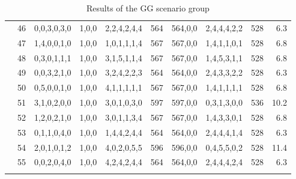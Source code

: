 \documentclass[review,12pt, 3p, times]{elsarticle}
\begin{document}
\begin{longtable}{|c|c|c|c|c|c|c|c|c|r|}
    & 46 & 0,0,3,0,3,0 & 1,0,0 &2,2,4,2,4,4 & 564 & 564,0,0 & 2,4,4,4,2,2 & 528 & 6.3  \\
    & 47 & 1,4,0,0,1,0 & 1,0,0 &1,0,1,1,1,4 & 567 & 567,0,0 & 1,4,1,1,0,1 & 528 & 6.8  \\
    & 48 & 0,3,0,1,1,1 & 1,0,0 &3,1,5,1,1,4 & 567 & 567,0,0 & 1,4,5,3,1,1 & 528 & 6.8  \\
    & 49 & 0,0,3,2,1,0 & 1,0,0 &3,2,4,2,2,3 & 564 & 564,0,0 & 2,4,3,3,2,2 & 528 & 6.3  \\
    & 50 & 0,5,0,0,1,0 & 1,0,0 &4,1,1,1,1,1 & 567 & 567,0,0 & 1,4,1,1,1,1 & 528 & 6.8  \\
    & 51 & 3,1,0,2,0,0 & 1,0,0 &3,0,1,0,3,0 & 597 & 597,0,0 & 0,3,1,3,0,0 & 536 & 10.2 \\
    & 52 & 1,2,0,2,1,0 & 1,0,0 &3,0,1,1,3,4 & 567 & 567,0,0 & 1,4,3,3,0,1 & 528 & 6.8  \\
    & 53 & 0,1,1,0,4,0 & 1,0,0 &1,4,4,2,4,4 & 564 & 564,0,0 & 2,4,4,4,1,4 & 528 & 6.3  \\
    & 54 & 2,0,1,0,1,2 & 1,0,0 &4,0,2,0,5,5 & 596 & 596,0,0 & 0,4,5,5,0,2 & 528 & 11.4 \\
    & 55 & 0,0,2,0,4,0 & 1,0,0 &4,2,4,2,4,4 & 564 & 564,0,0 & 2,4,4,4,2,4 & 528 & 6.3  \\
	\hline
	\hline
	\caption{Results of the GG scenario group} 
	\label{tab:tr_gg}
\end{longtable}
\end{document}
